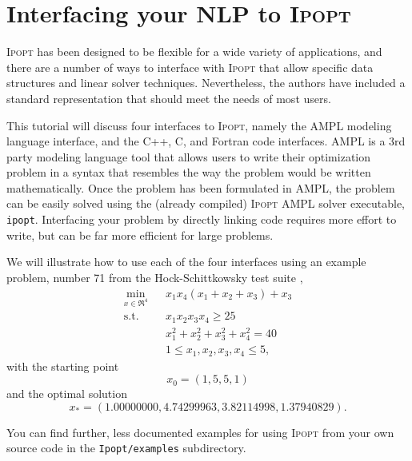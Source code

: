\documentclass[10pt]{article}
\newcommand{\Ipopt}{\textsc{Ipopt}\xspace}
\begin{document}
\section{Interfacing your NLP to \Ipopt}
\label{sec:tutorial-example}

\Ipopt has been designed to be flexible for a wide variety of
applications, and there are a number of ways to interface with \Ipopt
that allow specific data structures and linear solver
techniques. Nevertheless, the authors have included a standard
representation that should meet the needs of most users.

This tutorial will discuss four interfaces to \Ipopt, namely the AMPL
modeling language\cite{FouGayKer:AMPLbook} interface, and the C++, C,
and Fortran code interfaces.  AMPL is a 3rd party modeling language
tool that allows users to write their optimization problem in a syntax
that resembles the way the problem would be written mathematically.
Once the problem has been formulated in AMPL, the problem can be
easily solved using the (already compiled) \Ipopt AMPL solver
executable, {\tt ipopt}. Interfacing your problem by directly linking
code requires more effort to write, but can be far more efficient for
large problems.

We will illustrate how to use each of the four interfaces using an
example problem, number 71 from the Hock-Schittkowsky test suite \cite{HS},
  \begin{eqnarray}
    \min_{x \in \Re^4} &&x_1 x_4 (x_1 + x_2 + x_3)  +  x_3 \label{eq:ex_obj} \\
    \mbox{s.t.}  &&x_1 x_2 x_3 x_4 \ge 25 \label{eq:ex_ineq} \\
    &&x_1^2 + x_2^2 + x_3^2 + x_4^2  =  40 \label{eq:ex_equ} \\
    &&1 \leq x_1, x_2, x_3, x_4 \leq 5, \label{eq:ex_bounds}
  \end{eqnarray}
with the starting point
\begin{equation}
x_0 = (1, 5, 5, 1) \label{eq:ex_startpt}
\end{equation}
and the optimal solution
\[
x_* = (1.00000000, 4.74299963, 3.82114998, 1.37940829). \nonumber
\]

You can find further, less documented examples for using \Ipopt from
your own source code in the {\tt Ipopt/examples} subdirectory.
\end{document}
